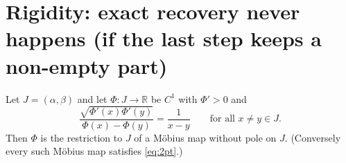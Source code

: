 \documentclass[11pt]{article}
\theoremstyle{definition}\newtheorem{example}[theorem]{Example}
\begin{document}
\section{Rigidity: exact recovery never happens (if the last step keeps a non-empty
part)}\label{sec:rigidity}

\begin{lemma}\label{lem:2pt}
Let $J=(\alpha,\beta)$ and let $\Phi:J\to\mathbb R$ be $C^1$ with $\Phi'>0$ and
\begin{equation}\label{eq:2pt}
 \frac{\sqrt{\Phi'(x)\Phi'(y)}}{\Phi(x)-\Phi(y)}=\frac1{x-y}\qquad\text{for all }x\ne y\in J .
\end{equation}
Then $\Phi$ is the restriction to $J$ of a M\"obius map without pole on $J$.  (Conversely every
such M\"obius map satisfies \eqref{eq:2pt}.)
\end{lemma}
\end{document}
